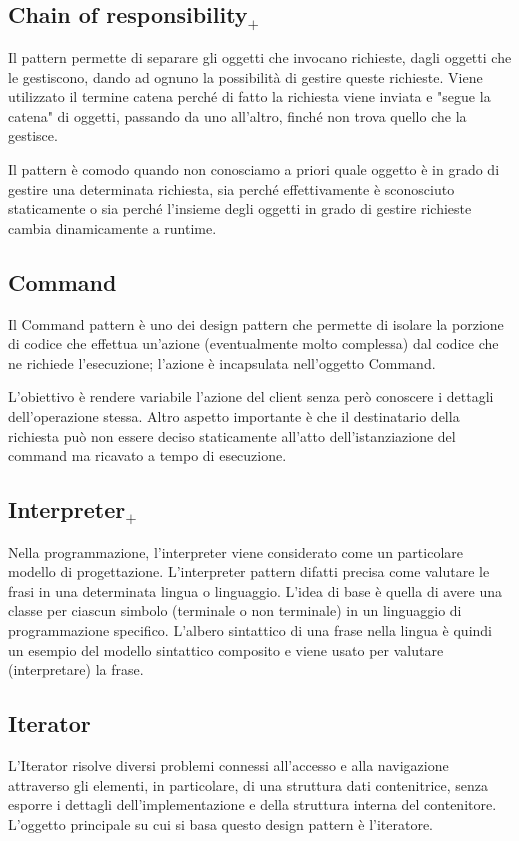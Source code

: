 \subsection{Chain of responsibility$_+$}
Il pattern permette di separare gli oggetti che invocano richieste, dagli oggetti che le gestiscono, dando ad ognuno la possibilità di gestire queste richieste. Viene utilizzato il termine catena perché di fatto la richiesta viene inviata e "segue la catena" di oggetti, passando da uno all'altro, finché non trova quello che la gestisce.

Il pattern è comodo quando non conosciamo a priori quale oggetto è in grado di gestire una determinata richiesta, sia perché effettivamente è sconosciuto staticamente o sia perché l'insieme degli oggetti in grado di gestire richieste cambia dinamicamente a runtime.

\subsection{Command}
Il Command pattern è uno dei design pattern che permette di isolare la porzione di codice che effettua un'azione (eventualmente molto complessa) dal codice che ne richiede l'esecuzione; l'azione è incapsulata nell'oggetto Command.

L'obiettivo è rendere variabile l'azione del client senza però conoscere i dettagli dell'operazione stessa. 
Altro aspetto importante è che il destinatario della richiesta può non essere deciso staticamente all'atto dell'istanziazione del command ma ricavato a tempo di esecuzione.

\subsection{Interpreter$_+$}
Nella programmazione, l'interpreter viene considerato come un particolare modello di progettazione. 
L'interpreter pattern difatti precisa come valutare le frasi in una determinata lingua o linguaggio. 
L'idea di base è quella di avere una classe per ciascun simbolo (terminale o non terminale) in un linguaggio di programmazione specifico.
L'albero sintattico di una frase nella lingua è quindi un esempio del modello sintattico composito e viene usato per valutare (interpretare) la frase.

\subsection{Iterator}
L'Iterator risolve diversi problemi connessi all'accesso e alla navigazione attraverso gli elementi, in particolare, di una struttura dati contenitrice, senza esporre i dettagli dell'implementazione e della struttura interna del contenitore. 
L'oggetto principale su cui si basa questo design pattern è l'iteratore.

